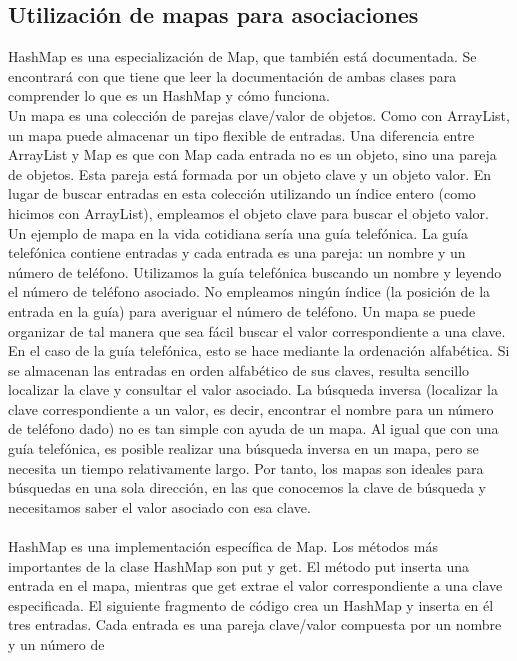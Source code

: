 \documentclass[11pt,a4paper]{article}
\begin{document}
	\subsection{Utilización de mapas para asociaciones}
	HashMap es una especialización de Map, que también está
	documentada. Se encontrará con que tiene que leer la documentación de ambas clases para comprender
	lo que es un HashMap y cómo funciona.\\
	Un mapa es una colección de parejas clave/valor de objetos. Como con ArrayList, un mapa
	puede almacenar un tipo flexible de entradas. Una diferencia entre ArrayList y Map es que con
	Map cada entrada no es un objeto, sino una pareja de objetos. Esta pareja está formada por un
	objeto clave y un objeto valor. En lugar de buscar entradas en esta colección utilizando un índice entero (como hicimos con
	ArrayList), empleamos el objeto clave para buscar el objeto valor.\\
	Un ejemplo de mapa en la vida cotidiana sería una guía telefónica. La guía telefónica contiene
	entradas y cada entrada es una pareja: un nombre y un número de teléfono. Utilizamos la guía
	telefónica buscando un nombre y leyendo el número de teléfono asociado. No empleamos ningún
	índice (la posición de la entrada en la guía) para averiguar el número de teléfono.
	Un mapa se puede organizar de tal manera que sea fácil buscar el valor correspondiente a una clave.
	En el caso de la guía telefónica, esto se hace mediante la ordenación alfabética. Si se almacenan
	las entradas en orden alfabético de sus claves, resulta sencillo localizar la clave y consultar el valor
	asociado. La búsqueda inversa (localizar la clave correspondiente a un valor, es decir, encontrar el
	nombre para un número de teléfono dado) no es tan simple con ayuda de un mapa. Al igual que
	con una guía telefónica, es posible realizar una búsqueda inversa en un mapa, pero se necesita un
	tiempo relativamente largo. Por tanto, los mapas son ideales para búsquedas en una sola dirección,
	en las que conocemos la clave de búsqueda y necesitamos saber el valor asociado con esa clave.\\
	\\
	HashMap es una implementación específica de Map. Los métodos más importantes de la clase
	HashMap son put y get.
	El método put inserta una entrada en el mapa, mientras que get extrae el valor correspondiente
	a una clave especificada. El siguiente fragmento de código crea un HashMap y inserta en él
	tres entradas. Cada entrada es una pareja clave/valor compuesta por un nombre y un número de
\end{document}
